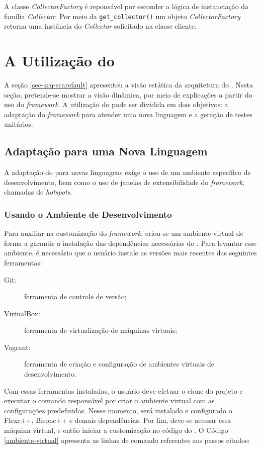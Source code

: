 A classe \textit{CollectorFactory} é reponsável por esconder a lógica de instanciação
da família \textit{Collector}. Por meio da \lstinline|get_collector()| um objeto
\textit{CollectorFactory} retorna uma instância do \textit{Collector} solicitado na
classe cliente.

\section{A Utilização do \Scarefault} \label{sec-util-scarefault}
A seção \ref{sec-arq-scarefault} apresentou a visão estática da arquitetura do
\Scarefault. Nesta seção, pretende-se mostrar a visão dinâmica, por meio
de explicações a partir do uso do \textit{framework}. A utilização do
\scarefault pode ser dividida em dois objetivos: a adaptação
do \textit{framework} para atender uma nova linguagem e a geração de testes unitários.
 
\subsection{Adaptação para uma Nova Linguagem}
A adaptação do \scarefault para novas linguagens exige o uso de um ambiente
específico de desenvolvimento, bem como o uso de janelas de extensibilidade
do \textit{framework}, chamadas de \textit{hotspots}.


\subsubsection{Usando o Ambiente de Desenvolvimento}
Para auxiliar na customização do \textit{framework}, criou-se um ambiente
virtual de forma a garantir a instalação das dependências necessárias do
\Scarefault. Para levantar esse ambiente, é necessário que o usuário instale as
versões mais recentes das seguintes ferramentas: 

\begin{description}
\item[Git:] ferramenta de controle de versão;
\item[VirtualBox:] ferramenta de virtualização de máquinas virtuais;
\item[Vagrant:] ferramenta de criação e configuração de ambientes virtuais de desenvolvimento.
\end{description} 

Com essas ferramentas instaladas, o usuário deve efetuar o clone do projeto
e executar o comando responsável por criar o ambiente virtual com as configurações
predefinidas. Nesse momento, será instalado e configurado o \textsf{Flexc++},
\textsf{Bisonc++} e demais dependências. Por fim, deve-se acessar essa máquina
virtual, e então iniciar a customização no código do \Scarefault. O Código
\ref{ambiente-virtual} apresenta as linhas de comando referentes aos passos citados:

